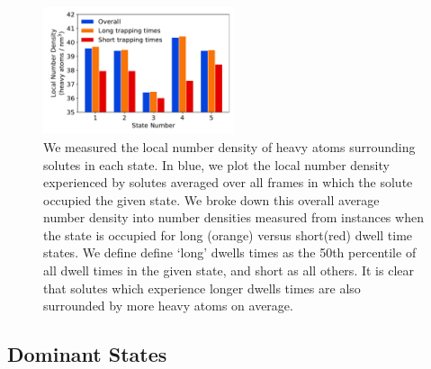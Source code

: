 \documentclass{article}
\begin{document}
  \begin{figure}[h]
  \centering
  \includegraphics[width=0.5\textwidth]{local_densities.pdf}
  \caption{We measured the local number density of heavy atoms surrounding solutes in each
  state. In blue, we plot the local number density experienced by solutes averaged over all
  frames in which the solute occupied the given state. We broke down this overall average 
  number density into number densities measured from instances when the state is occupied 
  for long (orange) versus short(red) dwell time states. We define define `long' dwells times
  as the 50th percentile of all dwell times in the given state, and short as all others. It
  is clear that solutes which experience longer dwells times are also surrounded by more 
  heavy atoms on average.}\label{fig:local_densities}
  \end{figure}
  
  \subsection{Dominant States}\label{section:state_prevelance}
  
\end{document}
